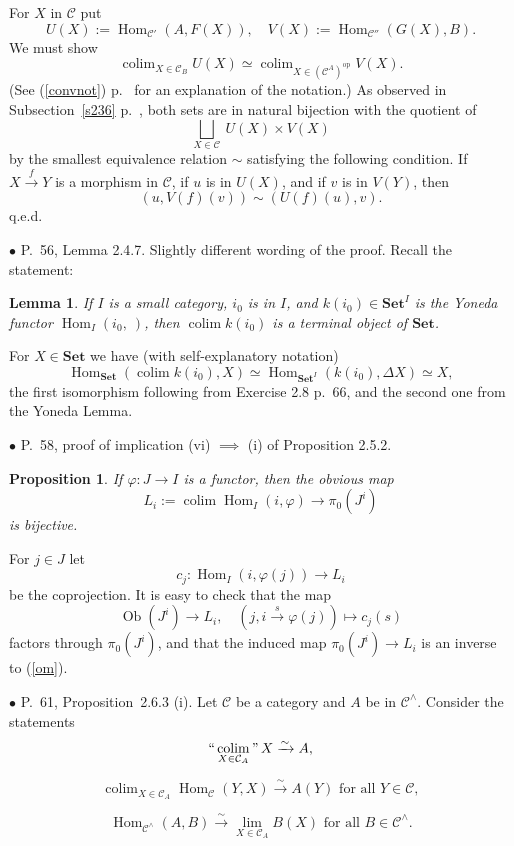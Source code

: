 \documentclass[12pt]{article}
\newtheorem{lem}[thm]{Lemma}
\newtheorem{prop}[thm]{Proposition}
\theoremstyle{remark}%
\newcommand{\bu}{\bullet}
\newcommand{\n}{\noindent}
\newcommand{\C}{\mathcal C}
\newcommand{\Set}{\textbf{Set}}
\newcommand{\p}{\varphi}
\newcommand{\pf}{\n{\em Proof. }}
\newcommand{\xr}{\xrightarrow}
\newcommand{\be}{\begin{equation}}
\newcommand{\ee}{\end{equation}}
\newcommand{\bl}{\begin{lem}}
\newcommand{\el}{\end{lem}}
\newcommand{\bp}{\begin{prop}}
\newcommand{\ep}{\end{prop}}
\newcommand{\pr}{Proposition}
\newcommand{\cn}{(See (\ref{convnot}) p.~\pageref{convnot} for an explanation of the notation.) }
\DeclareMathOperator*{\coli}{colim}
\DeclareMathOperator*{\co}{colim}
\DeclareMathOperator*{\ic}{``\coli"}
\DeclareMathOperator{\Hom}{Hom}
\DeclareMathOperator{\h}{Hom}
\DeclareMathOperator{\Ob}{Ob}
\DeclareMathOperator{\op}{op}
\begin{document}
\n{\em Second proof.} For $X$ in $\C$ put 
% 
\be\label{p2}
U(X):=\h_{\C'}(A,F(X)),\quad V(X):=\h_{\C''}(G(X),B). 
\ee
% 
We must show 
$$
\co_{X\in\C_B}U(X)\simeq\co_{X\in(\C^A)^{\op}}V(X). 
$$ 
\cn As observed in Subsection~\ref{s236} p.~\pageref{s236}, both sets are in natural bijection with the quotient of 
$$
\bigsqcup_{X\in\C}\ U(X)\times V(X) 
$$ 
by the smallest equivalence relation $\sim$ satisfying the following condition. If $X\xr fY$ is a morphism in $\C$, if $u$ is in $U(X)$, and if $v$ is in $V(Y)$, then 
$$
(u,V(f)(v))\sim(U(f)(u),v). 
$$ 
q.e.d. 


\n$\bu$ P.~56, Lemma 2.4.7. Slightly different wording of the proof. Recall the statement: 
%
\bl 
If $I$ is a small category, $i_0$ is in $I$, and $k(i_0)\in\Set^I$ is the Yoneda functor $\Hom_I(i_0,\ )$, then $\coli k(i_0)$ is a terminal object of $\Set$. 
\el
% 
\pf For $X\in\Set$ we have (with self-explanatory notation)
$$
\Hom_{\Set}\left(\coli k(i_0),X\right)\simeq\Hom_{{\Set}^I}(k(i_0),\Delta X)\simeq X,
$$
the first isomorphism following from Exercise 2.8 p.~66, and the second one from the Yoneda Lemma. 


\n$\bu$ P.~58, proof of implication (vi) $\implies$ (i) of Proposition 2.5.2. 
%
\bp 
If $\p:J\to I$ is a functor, then the obvious map  
\begin{equation}\label{om}
L_i:=\coli\Hom_I(i,\p)\to\pi_0(J^i)
\end{equation}
is bijective. 
\ep
%  
\pf For $j\in J$ let 
$$
c_j:\Hom_I(i,\p(j))\to L_i
$$
be the coprojection. It is easy to check that the map 
$$
\Ob(J^i)\to L_i,\quad (j,i\overset{s}{\to}\p(j))\mapsto c_j(s)
$$
factors through $\pi_0(J^i)$, and that the induced map $\pi_0(J^i)\to L_i$ is an inverse to (\ref{om}). 


\n$\bu$ P.~61, \pr\ 2.6.3 (i). Let $\C$ be a category and $A$ be in $\C^\wedge$. Consider the statements  
% 
\begin{equation}\label{263a}
\ic_{X\in\C_A}X\xrightarrow\sim A, 
\end{equation} 

\begin{equation}\label{263b}
\co_{X\in\C_A}\h_\C(Y,X)\xrightarrow\sim A(Y)\text{ for all }Y\in\C, 
\end{equation}

\begin{equation}\label{263} 
\h_{\C^\wedge}(A,B)\xrightarrow\sim\lim_{X\in\C_A}B(X)\text{ for all }B\in\C^\wedge. 
\end{equation} 
\end{document}
